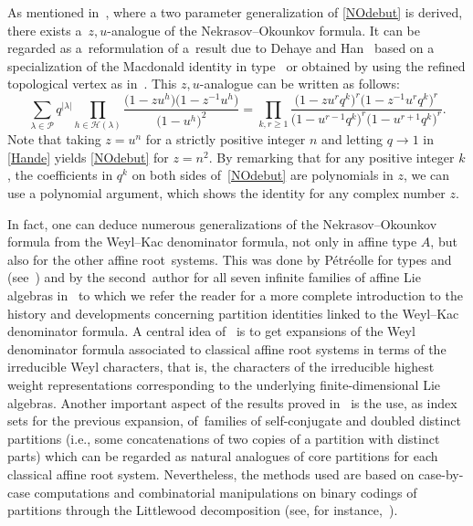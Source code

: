 \documentclass[10pt,a4paper]{amsart}
\numberwithin{equation}{section}
\def\cch{\mathcal H}
\def\ccp{\mathcal P}
\begin{document}
As mentioned in~\cite{CRV,RW}, where a two parameter generalization of \eqref{NOdebut} is derived, there exists a~$z,u$-analogue of the Nekrasov--Okounkov formula. It can be regarded as a~reformulation of a~result due to Dehaye and Han~\cite{HD} based on a specialization of the Macdonald identity in type~ or obtained by using the refined topological vertex as in~\cite{INRS}. This $z,u$-analogue can be written as follows:
\begin{equation}\label{Hande}
\sum_{\lambda\in\ccp}q^{\lvert \lambda\rvert}\prod_{h\in\cch(\lambda)}\frac{\bigl(1-zu^h\bigr)\bigl(1-z^{-1}u^h\bigr)}{\bigl(1-u^h\bigr)^2}=\prod_{k,r\geq 1}\frac{\bigl(1-zu^rq^k\bigr)^r\bigl(1-z^{-1}u^rq^k\bigr)^r}{\bigl(1-u^{r-1}q^k\bigr)^r\bigl(1-u^{r+1}q^k\bigr)^r}.
\end{equation}
\noindent Note that taking $z=u^n$ for a strictly positive integer $n$ and letting $q\rightarrow 1$ in \eqref{Hande} yields \eqref{NOdebut} for $z=n^2$. By remarking that for any positive integer $k$, the coefficients in $q^k$ on both sides of~\eqref{NOdebut} are polynomials in $z$, we can use a polynomial argument, which shows the identity for any complex number $z$.

In fact, one can deduce numerous generalizations of the
Nekrasov--Okounkov formula from the Weyl--Kac denominator formula, not only in
affine type $A$, but also for the other affine root~systems. This was done by P\'etr\'eolle for types  and  (see~\cite{MP}) and by the second~author for all seven infinite families of affine Lie algebras in~\cite[Section $5.3$]{Wmac} to which we refer the reader
for a more complete introduction to the history and developments concerning partition identities linked to the Weyl--Kac denominator formula. A central idea of~\cite{Wmac} is to get expansions of
the Weyl denominator formula associated to classical affine root systems in
terms of the irreducible Weyl characters, that is, the characters of the
irreducible highest weight representations corresponding to the underlying
finite-dimensional Lie algebras. Another important aspect of the results
proved in~\cite{Wmac} is the use, as index sets for the previous expansion,
of~families of self-conjugate and doubled distinct partitions (i.e., some concatenations of two copies of a partition with distinct parts) which can be regarded as natural analogues of core partitions for each classical affine root system. Nevertheless, the methods used are based on case-by-case
computations and combinatorial manipulations on binary codings of
partitions through the Littlewood decomposition (see, for instance,~\cite{HJ}).
\end{document}
